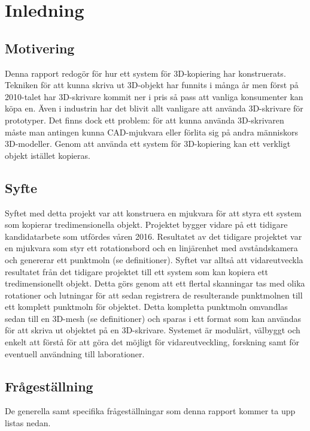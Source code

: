 \chapter{Inledning}
\label{cha:introduction}

\section{Motivering}
\label{sec:motivation}

Denna rapport redogör för hur ett system för 3D-kopiering har konstruerats. Tekniken för att kunna skriva ut 3D-objekt har funnits i många år men först på 2010-talet har 3D-skrivare kommit ner i pris så pass att vanliga konsumenter kan köpa en. Även i industrin har det blivit allt vanligare att använda 3D-skrivare för prototyper. Det finns dock ett problem: för att kunna använda 3D-skrivaren måste man antingen kunna CAD-mjukvara eller förlita sig på andra människors 3D-modeller. Genom att använda ett system för 3D-kopiering kan ett verkligt objekt istället kopieras.


\section{Syfte}
\label{sec:aim}

Syftet med detta projekt var att konstruera en mjukvara för att styra ett system som kopierar tredimensionella objekt. Projektet bygger vidare på ett tidigare kandidatarbete som utfördes våren 2016. Resultatet av det tidigare projektet var en mjukvara som styr ett rotationsbord och en linjärenhet med avståndskamera och genererar ett punktmoln (se definitioner). Syftet var alltså att vidareutveckla resultatet från det tidigare projektet till ett system som kan kopiera ett tredimensionellt objekt. Detta görs genom att ett flertal skanningar tas med olika rotationer och lutningar för att sedan registrera de resulterande punktmolnen till ett komplett punktmoln för objektet. Detta kompletta punktmoln omvandlas sedan till en 3D-mesh (se definitioner) och sparas i ett format som kan användas för att skriva ut objektet på en 3D-skrivare. Systemet är modulärt, välbyggt och enkelt att förstå för att göra det möjligt för vidareutveckling, forskning samt för eventuell användning till laborationer.   


\section{Frågeställning}
De generella samt specifika frågeställningar som denna rapport kommer ta upp listas nedan.

